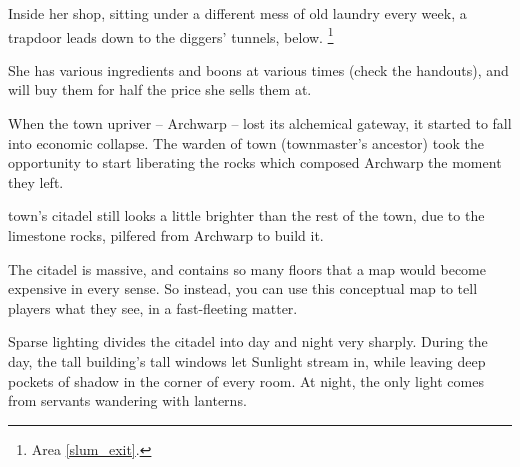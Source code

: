 \begin{multicols}{2}
Inside her shop, sitting under a different mess of old laundry every week, a trapdoor leads down to the \glspl{digger}' tunnels, below.%
\footnote{Area \vref{slum_exit}.}

She has various \glspl{ingredient} and \glspl{boon} at various times (check the handouts), and will buy them for half the price she sells them at.



\begin{exampletext}
  When the town upriver -- Archwarp -- lost its alchemical gateway, it started to fall into economic collapse.
  The \gls{warden} of \gls{town} (\gls{townmaster}'s ancestor) took the opportunity to start liberating the rocks which composed Archwarp the moment they left.

  \Gls{town}'s citadel still looks a little brighter than the rest of the town, due to the limestone rocks, pilfered from Archwarp to build it.
\end{exampletext}

The citadel is massive, and contains so many floors that a map would become expensive in every sense.
So instead, you can use this conceptual map to tell players what they see, in a fast-fleeting matter.

Sparse lighting divides the citadel into day and night very sharply.
During the day, the tall building's tall windows let Sunlight stream in, while leaving deep pockets of shadow in the corner of every room.
At night, the only light comes from servants wandering with lanterns.


\end{multicols}
